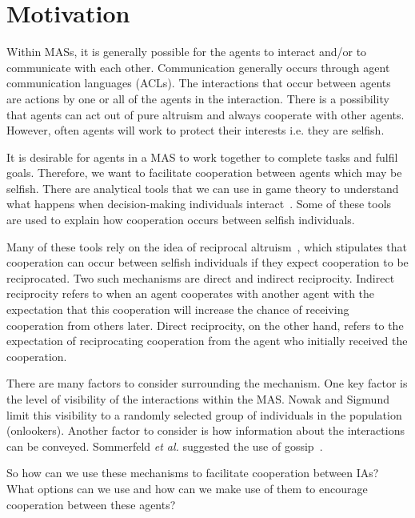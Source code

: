\documentclass[]{final_report}
\begin{document}
\section{Motivation}
Within MASs, it is generally possible for the agents to interact and/or to communicate with each other. Communication generally occurs through agent communication languages (ACLs). The interactions that occur between agents are actions by one or all of the agents in the interaction. There is a possibility that agents can act out of pure altruism and always cooperate with other agents. However, often agents will work to protect their interests i.e. they are selfish.\par
It is desirable for agents in a MAS to work together to complete tasks and fulfil goals. Therefore, we want to facilitate cooperation between agents which may be selfish. There are analytical tools that we can use in game theory to understand what happens when decision-making individuals interact~\cite{myerson2013game}. Some of these tools are used to explain how cooperation occurs between selfish individuals.\par
Many of these tools rely on the idea of reciprocal altruism~\cite{trivers1971evolution}, which stipulates that cooperation can occur between selfish individuals if they expect cooperation to be reciprocated. Two such mechanisms are direct and indirect reciprocity. Indirect reciprocity refers to when an agent cooperates with another agent with the expectation that this cooperation will increase the chance of receiving cooperation from others later. Direct reciprocity, on the other hand, refers to the expectation of reciprocating cooperation from the agent who initially received the cooperation.\par
There are many factors to consider surrounding the mechanism. One key factor is the level of visibility of the interactions within the MAS. Nowak and Sigmund~\cite{evol_indirect_image} limit this visibility to a randomly selected group of individuals in the population (onlookers). Another factor to consider is how information about the interactions can be conveyed. Sommerfeld \textit{et al.} suggested the use of gossip~\cite{gossip_alt}.\par 
So how can we use these mechanisms to facilitate cooperation between IAs? What options can we use and how can we make use of them to encourage cooperation between these agents?
\end{document}
